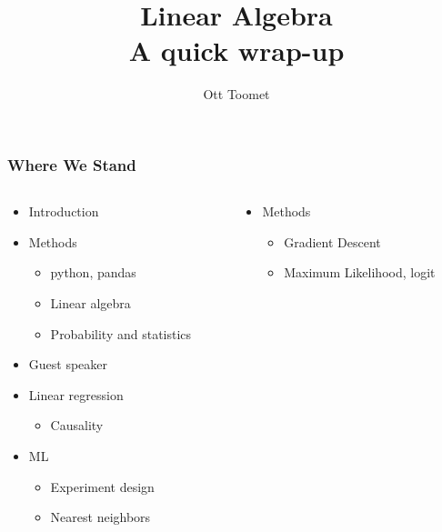 \documentclass[mathserif, xcolor=table, svgnames]{beamer}
\title{Linear Algebra\\
A quick wrap-up}
\author{Ott Toomet}
\begin{document}

\begin{frame}
  \maketitle
\end{frame}

\begin{frame}
  \tableofcontents
\end{frame}

\begin{frame}
\frametitle{Where We Stand}
\begin{columns}
  \begin{column}{0.5\linewidth}
    \begin{itemize}
    \item Introduction
    \item Methods
      \begin{itemize}
      \item python, pandas
      \item \alert{Linear algebra}
      \item Probability and statistics
      \end{itemize}
    \item Guest speaker
    \item Linear regression
      \begin{itemize}
      \item Causality
      \end{itemize}
    \item ML
      \begin{itemize}
      \item Experiment design
      \item Nearest neighbors
      \end{itemize}
    \end{itemize}
  \end{column}
  \begin{column}{0.5\linewidth}
    \begin{itemize}
    \item Methods
      \begin{itemize}
      \item Gradient Descent 
      \item Maximum Likelihood, logit

\end{itemize}
\end{itemize}
\end{column}
\end{columns}
\end{frame}
\end{document}

